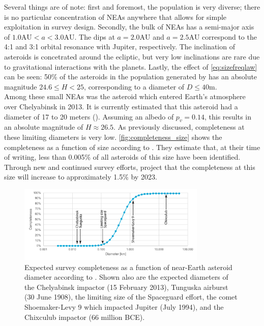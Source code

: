 Several things are of note: first and foremost, the population is very diverse; there is no particular concentration of NEAs anywhere that allows for simple exploitation in survey design. Secondly, the bulk of NEAs has a semi-major axis of $1.0 \mathrm{AU} < a < 3.0 \mathrm{AU}$. The dips at $a = 2.0 \mathrm{AU}$ and $a = 2.5 \mathrm{AU}$ correspond to the 4:1 and 3:1 orbital resonance with Jupiter, respectively. The inclination of asteroids is concetrated around the ecliptic, but very low inclinations are rare due to gravitational interactions with the planets. Lastly, the effect of \autoref{eq:sizefreqlaw} can be seen: 50\% of the asteroids in the population generated by \cite{GranvikPopulation} has an absolute magnitude $24.6 \leq H < 25$, corresponding to a diameter of $D \leq 40 \mathrm{m}$. \\

Among these small NEAs was the asteroid which entered Earth's atmosphere over Chelyabinsk in 2013. It is currently estimated that this asteroid had a diameter of 17 to 20 meters (\cite{ChelyabinskNASA}). Assuming an albedo of $p_v = 0.14$, this results in an absolute magnitude of $H \approx 26.5$. As previously discussed, completeness at these limiting diameters is very low. \autoref{fig:completeness_size} shows the completeness as a function of size according to \cite{HarrisPopulation}. They estimate that, at their time of writing, less than 0.005\% of all asteroids of this size have been identified. Through new and continued survey efforts, \cite{2017NEOSDT} project that the completeness at this size will increase to approximately 1.5\% by 2023. \\

\begin{figure}[htbp]
 \centering
 \includegraphics[width=0.8\textwidth]{img/completeness_size.pdf}
 \caption{Expected survey completeness as a function of near-Earth asteroid diameter according to \cite{HarrisPopulation}. Shown also are the expected diameters of the Chelyabinsk impactor (15 February 2013), Tunguska airburst (30 June 1908), the limiting size of the Spaceguard effort, the comet Shoemaker-Levy 9 which impacted Jupiter (July 1994), and the Chixculub impactor (66 million BCE).}
 \label{fig:completeness_size}
\end{figure}

